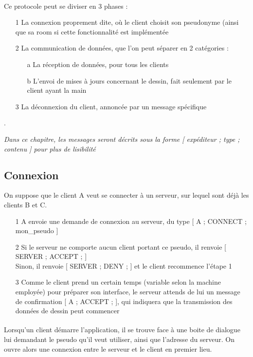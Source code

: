 \documentclass[a4paper,10pt]{article}
\begin{document}
\paragraph{}Ce protocole peut se diviser en 3 phases : 
\begin{itemize}
	\item[1] La connexion proprement dite, où le client choisit son pseudonyme (ainsi que sa room si cette fonctionnalité est implémentée
	\item[2] La communication de données, que l'on peut séparer en 2 catégories :
	\begin{itemize}
		\item[a] La réception de données, pour tous les clients
		\item[b] L'envoi de mises à jours concernant le dessin, fait seulement par le client ayant la main
	\end{itemize}
	\item[3] La déconnexion du client, annoncée par un message spécifique
\end{itemize}
.

\textit{Dans ce chapitre, les messages seront décrits sous la forme [ expéditeur ; type ; contenu ] pour plus de lisibilité}

\subsection{Connexion}
On suppose que le client A veut se connecter à un serveur, sur lequel sont déjà les clients B et C.
\begin{itemize}
	\item[1] A envoie une demande de connexion au serveur, du type [ A ; CONNECT ; mon\_pseudo ]
	\item[2] Si le serveur ne comporte aucun client portant ce pseudo, il renvoie [ SERVER ; ACCEPT ; ] \\
	Sinon, il renvoie [ SERVER ; DENY ; ] et le client recommence l'étape 1
	\item[3] Comme le client prend un certain temps (variable selon la machine employée) pour préparer son interface, le serveur attends de lui un message de confirmation [ A ; ACCEPT ; ], qui indiquera que la transmission des données de dessin peut commencer
\end{itemize}

\paragraph{}Lorsqu'un client démarre l'application, il se trouve face à une boite de dialogue lui demandant le pseudo qu'il veut utiliser, ainsi que l'adresse du serveur. On ouvre alors une connexion entre le serveur et le client en premier lieu.
\end{document}
